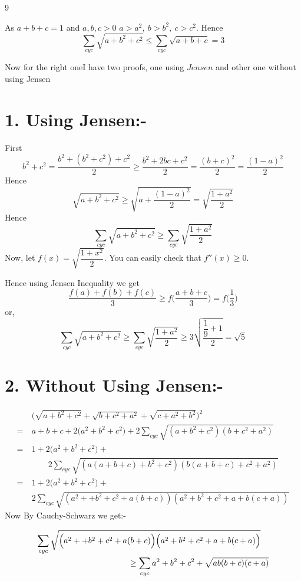9\documentclass[12pt]{article}
\begin{document}
	\pagebreak
\Huge{As $a+b+c=1$ and $a,b,c>0$ $a>a^2,\ b>b^2,\ c>c^2$. Hence $$\sum_{cyc}\sqrt{a+b^2+c^2} \leq\sum_{cyc} \sqrt{a+b+c}=3$$
	
Now for the right oneI have two proofs, one using $Jensen$ and other one without using Jensen
\section*{\Huge{1. Using Jensen:-}}
First $$b^2+c^2=\frac{b^2+(b^2+c^2)+c^2}{2}\geq \frac{b^2+2bc+c^2}{2}=\frac{(b+c)^2}{2}=\frac{(1-a)^2}{2}$$Hence $$\sqrt{a+b^2+c^2}\geq \sqrt{a+\frac{(1-a)^2}{2}}=\sqrt{\frac{1+a^2}{2}}$$Hence$$\sum_{cyc}\sqrt{a+b^2+c^2}\geq \sum_{cyc}\sqrt{\frac{1+a^2}{2}}$$Now, let $f(x)=\sqrt{\dfrac{1+x^2}{2}}$. You can easily check that $f''(x)\geq 0$.

\vspace*{2mm}

Hence using Jensen Inequality we get $$\frac{f(a)+f(b)+f(c)}{3}\geq f\bigg(\frac{a+b+c}{3}\bigg)=f\bigg(\frac{1}{3}\bigg)$$or,$$\sum_{cyc}\sqrt{a+b^2+c^2}\geq \sum_{cyc}\sqrt{\frac{1+a^2}{2}}\geq 3\sqrt{\frac{\dfrac{1}{9}+1}{2}}=\sqrt{5}$$

\section*{\Huge{2. Without Using Jensen:-}}
\begin{align}
& \Big(\sqrt{a+b^2+c^2}+\sqrt{b+c^2+a^2}+\sqrt{c+a^2+b^2}  \Big)^2\nonumber  \\[2mm]
=\ & a+b+c+2\Big(a^2+b^2+c^2\Big)+2\sum_{cyc}\sqrt{(a+b^2+c^2)(b+c^2+a^2)}\nonumber  \\[2mm]
=\ & 1+2\Big(a^2+b^2+c^2\Big)+\nonumber \\[2mm]
& \qquad 2\sum_{cyc}\sqrt{(a(a+b+c)+b^2+c^2)(b(a+b+c)+c^2+a^2)}\nonumber  \\[5mm]
=\ & 1+2\Big(a^2+b^2+c^2\Big)+ \nonumber \\[2mm]
&  \label{eq:1} 2\sum_{cyc}\sqrt{(a^2++b^2+c^2+a(b+c))(a^2+b^2+c^2+a+b(c+a))}
\end{align}
Now By Cauchy-Schwarz we get:-

\begin{equation}
\label{eq:2}\splitdfrac{\displaystyle{\sum_{cyc}\sqrt{\Big(a^2++b^2+c^2+a(b+c)\Big)\Big(a^2+b^2+c^2+a+b(c+a)\Big)}}}{{\displaystyle{\geq \sum_{cyc} a^2+b^2+c^2+\sqrt{ab(b+c)(c+a)}}}}
\end{equation}

}
\end{document}
